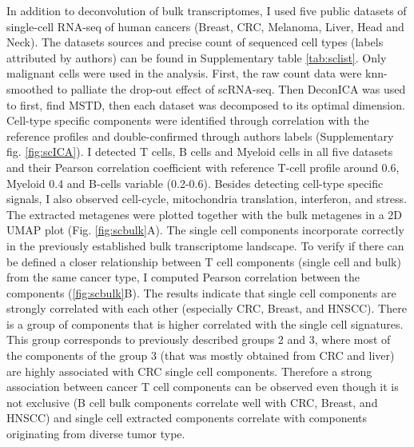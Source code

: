 \documentclass[12pt,]{book}
\theoremstyle{definition}
\theoremstyle{definition}
\theoremstyle{definition}
\theoremstyle{remark}
\begin{document}
In addition to deconvolution of bulk transcriptomes, I used five public
datasets of single-cell RNA-seq of human cancers (Breast, CRC, Melanoma,
Liver, Head and Neck). The datasets sources and precise count of
sequenced cell types (labels attributed by authors) can be found in
Supplementary table \ref{tab:sclist}. Only malignant cells were used in
the analysis. First, the raw count data were knn-smoothed
\citep{Wagner2018} to palliate the drop-out effect of scRNA-seq. Then
DeconICA was used to first, find MSTD\citep{Kairov2017}, then each
dataset was decomposed to its optimal dimension. Cell-type specific
components were identified through correlation with the reference
profiles and double-confirmed through authors labels (Supplementary fig.
\ref{fig:scICA}). I detected T cells, B cells and Myeloid cells in all
five datasets and their Pearson correlation coefficient with reference
T-cell profile around 0.6, Myeloid 0.4 and B-cells variable (0.2-0.6).
Besides detecting cell-type specific signals, I also observed
cell-cycle, mitochondria translation, interferon, and stress. The
extracted metagenes were plotted together with the bulk metagenes in a
2D UMAP plot (Fig. \ref{fig:scbulk}A). The single cell components
incorporate correctly in the previously established bulk transcriptome
landscape. To verify if there can be defined a closer relationship
between T cell components (single cell and bulk) from the same cancer
type, I computed Pearson correlation between the components
(\ref{fig:scbulk}B). The results indicate that single cell components
are strongly correlated with each other (especially CRC, Breast, and
HNSCC). There is a group of components that is higher correlated with
the single cell signatures. This group corresponds to previously
described groups 2 and 3, where most of the components of the group 3
(that was mostly obtained from CRC and liver) are highly associated with
CRC single cell components. Therefore a strong association between
cancer T cell components can be observed even though it is not exclusive
(B cell bulk components correlate well with CRC, Breast, and HNSCC) and
single cell extracted components correlate with components originating
from diverse tumor type.
\end{document}
